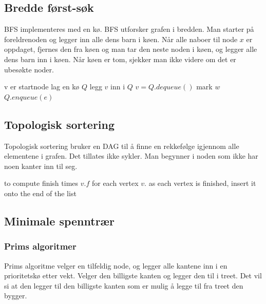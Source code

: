\documentclass[a4paper, norsk,  10pt]{article}
\begin{document}
{{\subsection{Bredde først-søk}

BFS implementeres med en kø.
BFS utforsker grafen i bredden. Man starter på foreldrenoden og legger inn alle dens barn i køen. Når alle naboer til node $x$ er oppdaget, fjernes den fra køen og man tar den neste noden i køen, og legger alle dens barn inn i køen. Når køen er tom, sjekker man ikke videre om det er ubesøkte noder. 

\begin{algorithmic}
 \Comment v er startnode 
	\State lag en kø $Q$
	\State legg $v$ inn i $Q$
		\State $v = Q.dequeue()$
				\State mark $w$
				\State $Q.enqueue(e)$
			\EndIf
		\EndFor
	\EndWhile
\EndFunction

\subsection{Topologisk sortering}

Topologisk sortering bruker en DAG til å finne en rekkefølge igjennom alle elementene i grafen. Det tillates ikke sykler. Man begynner i noden som ikke har noen kanter inn til seg. 

\begin{algorithmic}
\State {} to compute finish times $v.f$ for each vertex $v$.
\State as each vertex is finished, insert it onto the end of the list
\State {}
\EndFunction
\end{algorithmic}

\subsection{Minimale spenntrær}

\subsubsection{Prims algoritmer}

Prims algoritme velger en tilfeldig node, og legger alle kantene inn i en prioritetskø etter vekt. Velger den billigste kanten og legger den til i treet.  Det vil si at den legger til den billigste kanten som er mulig å legge til fra treet den bygger. \\ \hfill


\end{algorithmic}}}
\end{document}
